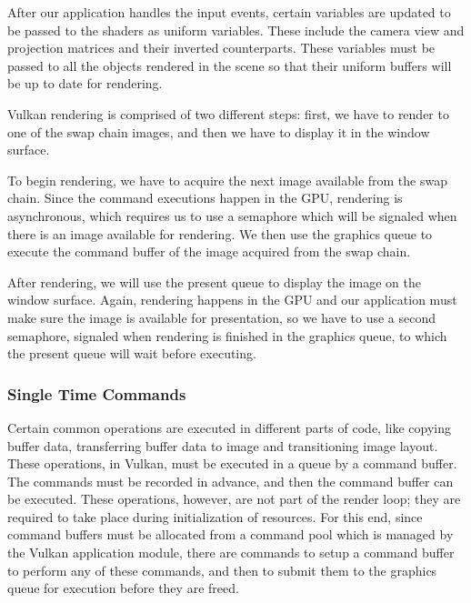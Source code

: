 After our application handles the input events, certain variables are updated to be passed to the shaders as uniform variables. These include the camera view and projection matrices and their inverted counterparts. These variables must be passed to all the objects rendered in the scene so that their uniform buffers will be up to date for rendering.

Vulkan rendering is comprised of two different steps: first, we have to render to one of the swap chain images, and then we have to display it in the window surface.

To begin rendering, we have to acquire the next image available from the swap chain. Since the command executions happen in the GPU, rendering is asynchronous, which requires us to use a semaphore which will be signaled when there is an image available for rendering. We then use the graphics queue to execute the command buffer of the image acquired from the swap chain.

After rendering, we will use the present queue to display the image on the window surface. Again, rendering happens in the GPU and our application must make sure the image is available for presentation, so we have to use a second semaphore, signaled when rendering is finished in the graphics queue, to which the present queue will wait before executing.

\subsubsection{Single Time Commands}
Certain common operations are executed in different parts of code, like copying buffer data, transferring buffer data to image and transitioning image layout. These operations, in Vulkan, must be executed in a queue by a command buffer. The commands must be recorded in advance, and then the command buffer can be executed. These operations, however, are not part of the render loop; they are required to take place during initialization of resources. For this end, since command buffers must be allocated from a command pool which is managed by the Vulkan application module, there are commands to setup a command buffer to perform any of these commands, and then to submit them to the graphics queue for execution before they are freed.

